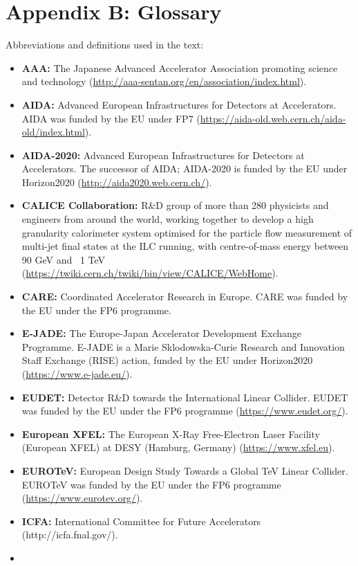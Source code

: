 \documentclass[%
 reprint,
 floatfix,
 amsmath,amssymb,
 aps,
]{revtex4-1}
\begin{document}
\section*{\label{Appendix4} \Large{Appendix B: Glossary} }
Abbreviations and definitions used in the text:
\begin{itemize}
\item
\textbf{AAA:} The Japanese Advanced Accelerator Association promoting science and technology (\url{http://aaa-sentan.org/en/association/index.html}).
\item
\textbf{AIDA:} Advanced European Infrastructures for Detectors at Accelerators. AIDA was funded by the EU under FP7 (\url{https://aida-old.web.cern.ch/aida-old/index.html}).
\item
\textbf{AIDA-2020:} Advanced European Infrastructures for Detectors at Accelerators. The successor of AIDA; AIDA-2020 is funded by the EU under Horizon2020 (\url{http://aida2020.web.cern.ch/}).
\item
\textbf{CALICE Collaboration:} R\&D group of more than 280 physicists and engineers from around the world, working together to develop a high granularity calorimeter system optimised for the particle flow measurement of multi-jet final states at the ILC running, with centre-of-mass energy between 90 GeV and ~1 TeV (\url{https://twiki.cern.ch/twiki/bin/view/CALICE/WebHome}).
\item
\textbf{CARE:} Coordinated Accelerator Research in Europe. CARE was funded by the EU under the FP6 programme.
\item
\textbf{E-JADE:} The Europe-Japan Accelerator Development Exchange Programme. E-JADE is a Marie Sklodowska-Curie Research and Innovation Staff Exchange (RISE) action, funded by the EU under Horizon2020 (\url{https://www.e-jade.eu/}).
\item
\textbf{EUDET:} Detector R\&D towards the International Linear Collider. EUDET was funded by the EU under the FP6 programme (\url{https://www.eudet.org/}).
\item
\textbf{European XFEL:} The European X-Ray Free-Electron Laser Facility (European XFEL) at DESY (Hamburg, Germany) (\url{https://www.xfel.eu}).
\item
\textbf{EUROTeV:} European Design Study Towards a Global TeV Linear Collider. EUROTeV was funded by the EU under the FP6 programme (\url{https://www.eurotev.org/}).
\item
\textbf{ICFA:} International Committee for Future Accelerators (http://icfa.fnal.gov/).
\item

\end{itemize}
\end{document}
